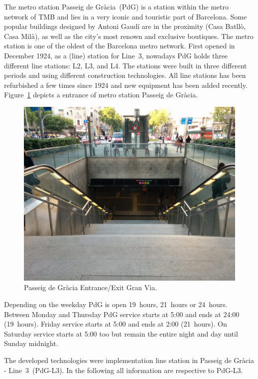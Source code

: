 The metro station Passeig de Gr\`{a}cia~(PdG) is a station within the metro network of TMB and lies in a very iconic and touristic part of Barcelona. Some popular buildings designed by Antoni Gaud\'{i} are in the proximity (Casa Batll\`{o}, Casa Mil\`{a}), as well as the city's most renown and exclusive boutiques.
The metro station is one of the oldest of the Barcelona metro network. First opened in December 1924, as a (line) station for Line~3, nowadays PdG holds three different line stations: L2, L3, and L4. The stations were built in three different periods and using different construction technologies. All line stations has been refurbished a few times since 1924 and new equipment has been added recently. Figure~\ref{fig:PdG_entranceExit} depicts a entrance of metro station Passeig de Gr\`{a}cia.

\begin{figure}[htbp]
  \centering
  \includegraphics[width=\linewidth]{Figures/PdG-L3_entranceExit.jpg} 
  \caption{Passeig de Gr\`{a}cia Entrance/Exit Gran Via. \cite{TMB_2014}}
  \label{fig:PdG_entranceExit}
\end{figure}

Depending on the weekday PdG is open 19~hours, 21~hours or 24~hours. Between Monday and Thursday PdG service starts at 5:00 and ends at 24:00 (19~hours). Friday service starts at 5:00 and ends at 2:00 (21~hours). On Saturday service starts at 5:00 too but remain the entire night and day until Sunday midnight.

The developed technologies were implementation line station in Passeig de Gr\`{a}cia - Line~3~(PdG-L3). In the following all information are respective to PdG-L3.

